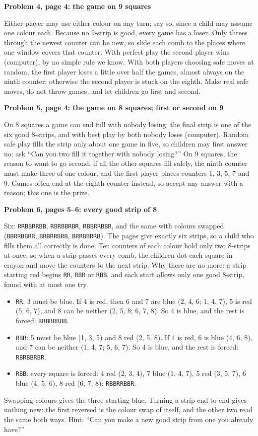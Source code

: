 \documentclass[11pt]{article}
\newcommand{\sub}[1]{\par\needspace{4\baselineskip}\textbf{#1}\par}
\newcommand{\st}[1]{\texttt{#1}}
\begin{document}
\sub{Problem 4, page 4: the game on 9 squares}
Either player may use either colour on any turn; say so, since a child may assume one colour each. Because no 9-strip is good, every game has a loser. Only threes through the newest counter can be new, so slide each comb to the places where one window covers that counter. With perfect play the second player wins (computer), by no simple rule we know. With both players choosing safe moves at random, the first player loses a little over half the games, almost always on the ninth counter; otherwise the second player is stuck on the eighth. Make real safe moves, do not throw games, and let children go first and second.

\sub{Problem 5, page 4: the game on 8 squares; first or second on 9}
On 8 squares a game can end full with nobody losing: the final strip is one of the six good 8-strips, and with best play by both nobody loses (computer). Random safe play fills the strip only about one game in five, so children may first answer no; ask ``Can you two fill it together with nobody losing?'' On 9 squares, the reason to want to go second: if all the other squares fill safely, the ninth counter must make three of one colour, and the first player places counters 1, 3, 5, 7 and 9. Games often end at the eighth counter instead, so accept any answer with a reason; this one is the prize.

\sub{Problem 6, pages 5--6: every good strip of 8}
Six: \st{RRBBRRBB}, \st{RBRBBRBR}, \st{RBBRRBBR}, and the same with colours swapped (\st{BBRRBBRR}, \st{BRBRRBRB}, \st{BRRBBRRB}). The pages give exactly six strips, so a child who fills them all correctly is done. Ten counters of each colour hold only two 8-strips at once, so when a strip passes every comb, the children dot each square in crayon and move the counters to the next strip. Why there are no more: a strip starting red begins \st{RR}, \st{RBR} or \st{RBB}, and each start allows only one good 8-strip, found with at most one try.
\begin{itemize}[leftmargin=1.2em]
\item \st{RR}: 3 must be blue. If 4 is red, then 6 and 7 are blue (2, 4, 6; 1, 4, 7), 5 is red (5, 6, 7), and 8 can be neither (2, 5, 8; 6, 7, 8). So 4 is blue, and the rest is forced: \st{RRBBRRBB}.
\item \st{RBR}: 5 must be blue (1, 3, 5) and 8 red (2, 5, 8). If 4 is red, 6 is blue (4, 6, 8), and 7 can be neither (1, 4, 7; 5, 6, 7). So 4 is blue, and the rest is forced: \st{RBRBBRBR}.
\item \st{RBB}: every square is forced: 4 red (2, 3, 4), 7 blue (1, 4, 7), 5 red (3, 5, 7), 6 blue (4, 5, 6), 8 red (6, 7, 8): \st{RBBRRBBR}.
\end{itemize}
Swapping colours gives the three starting blue. Turning a strip end to end gives nothing new: the first reversed is the colour swap of itself, and the other two read the same both ways. Hint: ``Can you make a new good strip from one you already have?''
\end{document}
